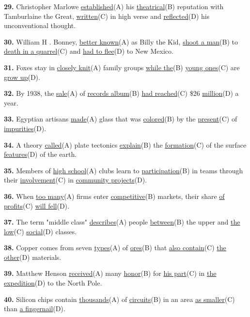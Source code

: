 \documentclass[12pt]{article}
\begin{document}
\par
\vspace{\questionblockgap}
\noindent\textbf{29.} Christopher Marlowe \uline{established}(A) his \uline{theatrical}(B) reputation with Tamburlaine the Great, \uline{written}(C) in high verse and \uline{reflected}(D) his unconventional thought.
\par
\vspace{\questionblockgap}
\noindent\textbf{30.} William H . Bonney, \uline{better known}(A) as Billy the Kid, \uline{shoot a man}(B) to \uline{death in a quarrel}(C) and \uline{had to flee}(D) to New Mexico.
\par
\vspace{\questionblockgap}
\noindent\textbf{31.} Foxes stay in \uline{closely knit}(A) family groups \uline{while the}(B) \uline{young ones}(C) are \uline{grow up}(D).
\par
\vspace{\questionblockgap}
\noindent\textbf{32.} By 1938, the \uline{sale}(A) of \uline{records album}(B) \uline{had reached}(C) \$26 \uline{million}(D) a year.
\par
\vspace{\questionblockgap}
\noindent\textbf{33.} Egyptian artisans \uline{made}(A) glass that was \uline{colored}(B) by the \uline{present}(C) of \uline{impurities}(D).
\par
\vspace{\questionblockgap}
\noindent\textbf{34.} A theory \uline{called}(A) plate tectonics \uline{explain}(B) the \uline{formation}(C) of the surface \uline{features}(D) of the earth.
\par
\vspace{\questionblockgap}
\noindent\textbf{35.} Members of \uline{high school}(A) clubs learn to \uline{participation}(B) in teams through their \uline{involvement}(C) in \uline{community projects}(D).
\par
\vspace{\questionblockgap}
\noindent\textbf{36.} When \uline{too many}(A) firms enter \uline{competitive}(B) markets, their share \uline{of profits}(C) \uline{will fell}(D).
\par
\vspace{\questionblockgap}
\noindent\textbf{37.} The term "middle class" \uline{describes}(A) people \uline{between}(B) the upper and \uline{the low}(C) \uline{social}(D) classes.
\par
\vspace{\questionblockgap}
\noindent\textbf{38.} Copper comes from seven \uline{types}(A) of \uline{ores}(B) that \uline{also contain}(C) \uline{the other}(D) materials.
\par
\vspace{\questionblockgap}
\noindent\textbf{39.} Matthew Henson \uline{received}(A) many \uline{honor}(B) for \uline{his part}(C) in \uline{the expedition}(D) to the North Pole.
\par
\vspace{\questionblockgap}
\noindent\textbf{40.} Silicon chips contain \uline{thousands}(A) of \uline{circuits}(B) in an area \uline{as smaller}(C) than \uline{a fingernail}(D).
\par
\vspace{\questionblockgap}
\end{document}
